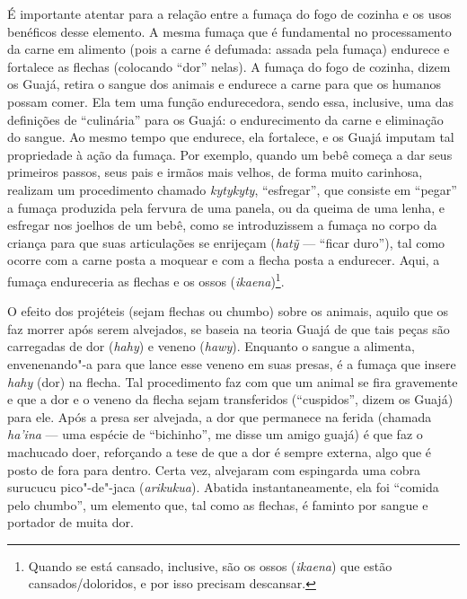 É importante atentar para a relação entre a fumaça do fogo de cozinha e
os usos benéficos desse elemento. A mesma fumaça que é fundamental no
processamento da carne em alimento (pois a carne é defumada: assada pela
fumaça) endurece e fortalece as flechas (colocando ``dor'' nelas). A
fumaça do fogo de cozinha, dizem os Guajá, retira o sangue dos animais e
endurece a carne para que os humanos possam comer. Ela tem uma função
endurecedora, sendo essa, inclusive, uma das definições de ``culinária''
para os Guajá: o endurecimento da carne e eliminação do sangue. Ao mesmo
tempo que endurece, ela fortalece, e os Guajá imputam tal propriedade à
ação da fumaça. Por exemplo, quando um bebê começa a dar seus primeiros
passos, seus pais e irmãos mais velhos, de forma muito carinhosa,
realizam um procedimento chamado \emph{kytykyty}, ``esfregar'', que
consiste em ``pegar'' a fumaça produzida pela fervura de uma panela, ou da
queima de uma lenha, e esfregar nos joelhos de um bebê, como se
introduzissem a fumaça no corpo da criança para que suas articulações se
enrijeçam (\emph{hatỹ} --- ``ficar duro''), tal como ocorre com a carne
posta a moquear e com a flecha posta a endurecer. Aqui, a fumaça
endureceria as flechas e os ossos (\emph{ikaena})\footnote{Quando se
  está cansado, inclusive, são os ossos (\emph{ikaena}) que estão
  cansados/doloridos, e por isso precisam descansar.}.

O efeito dos projéteis (sejam flechas ou chumbo) sobre os animais,
aquilo que os faz morrer após serem alvejados, se baseia na teoria Guajá
de que tais peças são carregadas de dor (\emph{hahy}) e veneno
(\emph{hawy}). Enquanto o sangue a alimenta, envenenando"-a para que
lance esse veneno em suas presas, é a fumaça que insere \emph{hahy}
(dor) na flecha. Tal procedimento faz com que um animal se fira
gravemente e que a dor e o veneno da flecha sejam transferidos
(``cuspidos'', dizem os Guajá) para ele. Após a presa ser alvejada, a dor
que permanece na ferida (chamada \emph{ha'ina} --- uma espécie de
``bichinho'', me disse um amigo guajá) é que faz o machucado doer,
reforçando a tese de que a dor é sempre externa, algo que é posto de
fora para dentro. Certa vez, alvejaram com espingarda uma cobra surucucu
pico"-de"-jaca (\emph{arikukua}). Abatida instantaneamente, ela foi
``comida pelo chumbo'', um elemento que, tal como as flechas, é faminto
por sangue e portador de muita dor.

